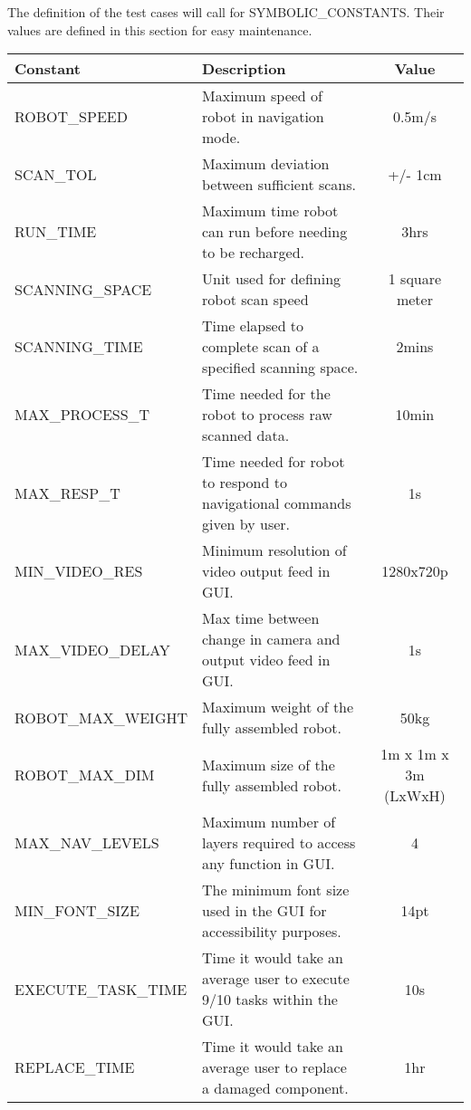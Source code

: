 \documentclass[12pt, titlepage]{article}
\newcommand{\RobotSpeed}{0.5m/s}
\newcommand{\ScanTolerance}{+/- 1cm}
\newcommand{\BatteryLife}{3hrs}
\newcommand{\ScanningSpace}{1 square meter}
\newcommand{\ScanningTime}{2mins}
\newcommand{\MaxProcessingTime}{10min}
\newcommand{\MaxResponseTime}{1s}
\newcommand{\MinVideoResolution}{1280x720p}
\newcommand{\MaxVideoDelay}{1s}
\newcommand{\RobotMaxWeight}{50kg}
\newcommand{\RobotMaxDimensions}{1m x 1m x 3m (LxWxH)}
\newcommand{\MaxNavLevels}{4}
\newcommand{\MinFontSize}{14pt}
\newcommand{\ExecuteTaskTime}{10s}
\newcommand{\ReplaceTime}{1hr}
\begin{document}
The definition of the test cases will call for SYMBOLIC\_CONSTANTS.
Their values are defined in this section for easy maintenance.\\

\begin{tabular}{ | l | p{6cm} | c |}
  \hline
  \textbf{Constant} & \textbf{Description} & \textbf{Value} \\
  \hline
  ROBOT\_SPEED & Maximum speed of robot in navigation mode. & \RobotSpeed{} \\
  \hline
  SCAN\_TOL & Maximum deviation between sufficient scans. & \ScanTolerance{} \\
  \hline
  RUN\_TIME & Maximum time robot can run before needing to be recharged. & \BatteryLife{} \\
  \hline
  SCANNING\_SPACE & Unit used for defining robot scan speed & \ScanningSpace{} \\
  \hline
  SCANNING\_TIME & Time elapsed to complete scan of a specified scanning space. & \ScanningTime{} \\
  \hline
  MAX\_PROCESS\_T & Time needed for the robot to process raw scanned data. & \MaxProcessingTime{} \\
  \hline
  MAX\_RESP\_T & Time needed for robot to respond to navigational commands given by user. & \MaxResponseTime{} \\
  \hline
  MIN\_VIDEO\_RES & Minimum resolution of video output feed in GUI. & \MinVideoResolution{} \\
  \hline
  MAX\_VIDEO\_DELAY & Max time between change in camera and output video feed in GUI. & \MaxVideoDelay{} \\
  \hline
  ROBOT\_MAX\_WEIGHT & Maximum weight of the fully assembled robot. & \RobotMaxWeight{} \\
  \hline
  ROBOT\_MAX\_DIM & Maximum size of the fully assembled robot. & \RobotMaxDimensions{} \\
  \hline
  MAX\_NAV\_LEVELS & Maximum number of layers required to access any function in GUI. & \MaxNavLevels{} \\
  \hline
  MIN\_FONT\_SIZE & The minimum font size used in the GUI for accessibility purposes. & \MinFontSize{} \\
  \hline
  EXECUTE\_TASK\_TIME & Time it would take an average user to execute 9/10 tasks within the GUI. & \ExecuteTaskTime{} \\
  \hline
  REPLACE\_TIME & Time it would take an average user to replace a damaged component. & \ReplaceTime{} \\
  \hline
  
\end{tabular}
\end{document}
